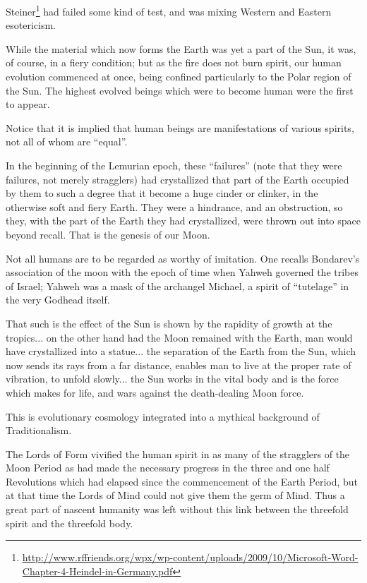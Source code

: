 Steiner\footnote{\url{http://www.rffriends.org/wpx/wp-content/uploads/2009/10/Microsoft-Word-Chapter-4-Heindel-in-Germany.pdf}} had failed some kind of test, and was mixing Western and Eastern esotericism.

\begin{quotex}
While the material which now forms the Earth was yet a part of the Sun, it was, of course, in a fiery condition; but as the fire does not burn spirit, our human evolution commenced at once, being confined particularly to the Polar region of the Sun. The highest evolved beings which were to become human were the first to appear.
\end{quotex}

Notice that it is implied that human beings are manifestations of various spirits, not all of whom are ``equal''.

\begin{quotex}
In the beginning of the Lemurian epoch, these ``failures'' (note that they were failures, not merely stragglers) had crystallized that part of the Earth occupied by them to such a degree that it become a huge cinder or clinker, in the otherwise soft and fiery Earth. They were a hindrance, and an obstruction, so they, with the part of the Earth they had crystallized, were thrown out into space beyond recall. That is the genesis of our Moon.
\end{quotex}

Not all humans are to be regarded as worthy of imitation. One recalls Bondarev's association of the moon with the epoch of time when Yahweh governed the tribes of Israel; Yahweh was a mask of the archangel Michael, a spirit of ``tutelage'' in the very Godhead itself.

\begin{quotex}
That such is the effect of the Sun is shown by the rapidity of growth at the tropics... on the other hand had the Moon remained with the Earth, man would have crystallized into a statue... the separation of the Earth from the Sun, which now sends its rays from a far distance, enables man to live at the proper rate of vibration, to unfold slowly... the Sun works in the vital body and is the force which makes for life, and wars against the death-dealing Moon force.
\end{quotex}

This is evolutionary cosmology integrated into a mythical background of Traditionalism.

\begin{quotex}
The Lords of Form vivified the human spirit in as many of the stragglers of the Moon Period as had made the necessary progress in the three and one half Revolutions which had elapsed since the commencement of the Earth Period, but at that time the Lords of Mind could not give them the germ of Mind. Thus a great part of nascent humanity was left without this link between the threefold spirit and the threefold body.
\end{quotex}

